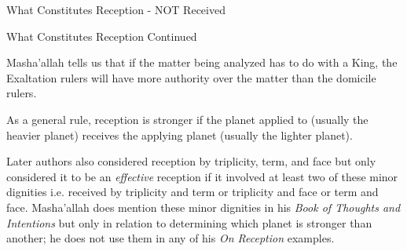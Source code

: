 \begin{frame}[t]{What Constitutes Reception - NOT Received}


\end{frame}
\begin{frame}[t]{What Constitutes Reception Continued}

Masha'allah tells us that if the matter being analyzed has to do with a King, the Exaltation rulers will have more authority over the matter than the domicile rulers.

As a general rule, reception is stronger if the planet applied to (usually the heavier planet) receives the applying planet (usually the lighter planet).

Later authors also considered reception by triplicity, term, and face but only considered it to be an \textsl{effective} reception if it involved at least two of these minor dignities i.e. received by triplicity and term or triplicity and face or term and face. Masha'allah does mention these minor dignities in his \textsl{Book of Thoughts and Intentions} but only in relation to determining which planet is stronger than another; he does not use them in any of his \textsl{On Reception} examples.

\end{frame}